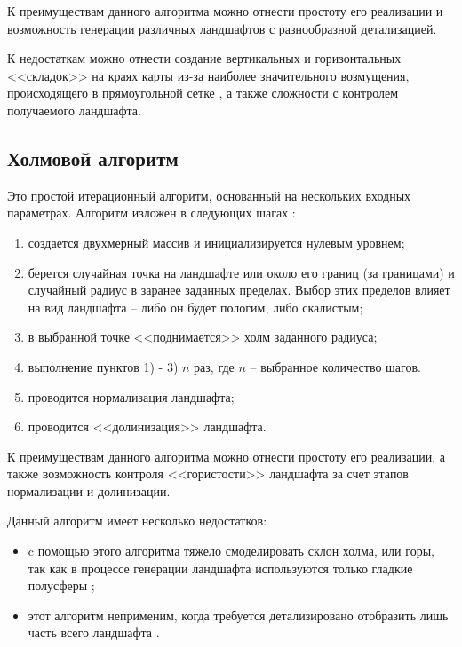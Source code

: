 К преимуществам данного алгоритма можно отнести простоту его реализации и возможность генерации различных ландшафтов с разнообразной детализацией.

К недостаткам можно отнести создание вертикальных и горизонтальных <<складок>> на краях карты из-за наиболее значительного возмущения, происходящего в прямоугольной сетке \cite{info_diaSquWiki}, а также сложности с контролем получаемого ландшафта.

\subsection{Холмовой алгоритм}

Это простой итерационный алгоритм, основанный на нескольких входных параметрах. Алгоритм изложен в следующих шагах \cite{info_hillAlg}:

\begin{enumerate}[label={\arabic*)}]
	\item создается двухмерный массив и инициализируется нулевым уровнем;
	\item берется случайная точка на ландшафте или около его границ (за границами) и случайный радиус в заранее заданных пределах. Выбор этих пределов влияет на вид ландшафта -- либо он будет пологим, либо скалистым; 
	\item в выбранной точке <<поднимается>> холм заданного радиуса;
	\item выполнение пунктов 1) - 3) $n$ раз, где $n$ -- выбранное количество шагов.
	\item проводится нормализация ландшафта;
	\item проводится <<долинизация>> ландшафта.
\end{enumerate}

К преимуществам данного алгоритма можно отнести простоту его реализации, а также возможность контроля <<гористости>> ландшафта за счет этапов нормализации и долинизации.

Данный алгоритм имеет несколько недостатков:

\begin{itemize}[label=--]
	\item c помощью этого алгоритма тяжело смоделировать склон холма, или
	горы, так как в процессе генерации ландшафта используются только
	гладкие полусферы \cite{info_hillAlgFlaws};
	\item этот алгоритм неприменим, когда требуется детализировано
	отобразить лишь часть всего ландшафта \cite{info_hillAlgFlaws}.
\end{itemize}


